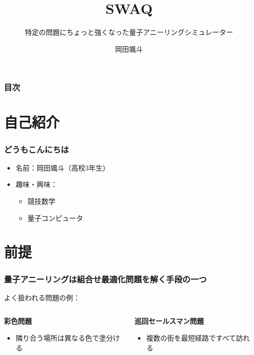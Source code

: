 \title[Swaq]{\color{black} \LARGE SWAQ}
\subtitle[ちょっと強いQAS]{特定の問題にちょっと強くなった量子アニーリングシミュレーター}
\author[岡田颯斗]{岡田颯斗}
\date{}
\begin{frame}{}
\titlepage
\end{frame}
\large

\begin{frame}
  \frametitle{目次}
  \tableofcontents
\end{frame}


\section{自己紹介}
\begin{frame}
  \frametitle{どうもこんにちは}
  \begin{itemize}
      \item 名前：岡田颯斗（高校3年生）
      \item 趣味・興味：
      \begin{itemize}
          \item 競技数学
          \item 量子コンピュータ
      \end{itemize}
  \end{itemize}
\end{frame}

\section{前提}
\begin{frame}
  \frametitle{量子アニーリングは組合せ最適化問題を解く手段の一つ}
  よく扱われる問題の例：\\
  \vspace{10mm}
  \begin{columns}
    \begin{column}{0.45\textwidth}
      \textbf{彩色問題}
      \begin{itemize}
          \item 隣り合う場所は異なる色で塗分ける
      \end{itemize}
    \end{column}

    \begin{column}{0.45\textwidth}
      \textbf{巡回セールスマン問題}
      \begin{itemize}
          \item 複数の街を最短経路ですべて訪れる
      \end{itemize}
    \end{column}
  \end{columns}
  \vspace{5mm}
\end{frame}


